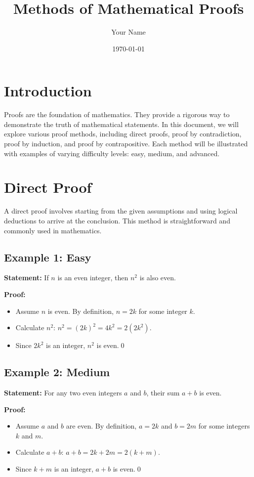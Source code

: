 \documentclass[12pt,a4paper]{article}
\title{\textbf{Methods of Mathematical Proofs}}
\author{Your Name}
\date{\today}
\begin{document}
\maketitle

\tableofcontents
\newpage

\section{Introduction}
Proofs are the foundation of mathematics. They provide a rigorous way to demonstrate the truth of mathematical statements. In this document, we will explore various proof methods, including direct proofs, proof by contradiction, proof by induction, and proof by contrapositive. Each method will be illustrated with examples of varying difficulty levels: easy, medium, and advanced.

\newpage

\section{Direct Proof}
A direct proof involves starting from the given assumptions and using logical deductions to arrive at the conclusion. This method is straightforward and commonly used in mathematics.

\subsection{Example 1: Easy}
\textbf{Statement:} If $n$ is an even integer, then $n^2$ is also even.

\textbf{Proof:}
\begin{itemize}
    \item Assume $n$ is even. By definition, $n = 2k$ for some integer $k$.
    \item Calculate $n^2$: $n^2 = (2k)^2 = 4k^2 = 2(2k^2)$.
    \item Since $2k^2$ is an integer, $n^2$ is even.\qed
\end{itemize}

\subsection{Example 2: Medium}
\textbf{Statement:} For any two even integers $a$ and $b$, their sum $a+b$ is even.

\textbf{Proof:}
\begin{itemize}
    \item Assume $a$ and $b$ are even. By definition, $a = 2k$ and $b = 2m$ for some integers $k$ and $m$.
    \item Calculate $a+b$: $a+b = 2k + 2m = 2(k+m)$.
    \item Since $k+m$ is an integer, $a+b$ is even.\qed
\end{itemize}
\end{document}
